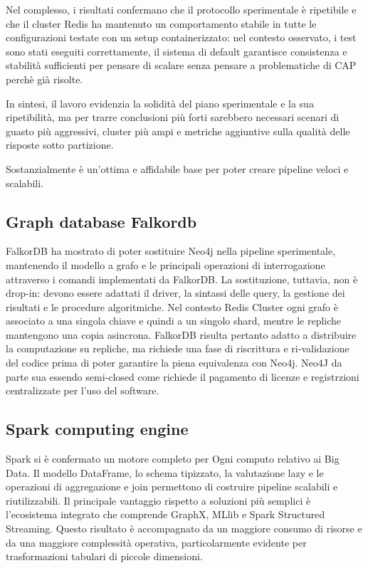 \documentclass{article}
\begin{document}
Nel complesso, i risultati confermano che il protocollo sperimentale è ripetibile e che il cluster Redis ha %
mantenuto un comportamento stabile in tutte le configurazioni testate con un %
setup containerizzato: %
nel contesto osservato, i test sono stati eseguiti correttamente, il sistema di default garantisce %
consistenza e stabilità sufficienti per pensare di scalare senza pensare a problematiche di CAP perchè
già risolte.

In sintesi, il lavoro evidenzia la solidità del piano sperimentale e la sua ripetibilità, ma per trarre %
conclusioni più forti sarebbero necessari scenari di guasto più aggressivi, cluster più ampi e metriche %
aggiuntive sulla qualità delle risposte sotto partizione.

Sostanzialmente è un'ottima e affidabile base per poter creare pipeline veloci e scalabili.

\subsection{Graph database Falkordb}
FalkorDB ha mostrato di poter sostituire Neo4j nella pipeline sperimentale, %
mantenendo il modello a grafo e le principali %
operazioni di interrogazione attraverso i comandi implementati da FalkorDB. La sostituzione, %
tuttavia, non è drop-in: devono essere adattati il driver, la sintassi delle query, %
la gestione dei risultati e le procedure algoritmiche. %
Nel contesto Redis Cluster ogni grafo è associato a una singola %
chiave e quindi a un singolo shard, mentre le repliche %
mantengono una copia asincrona. FalkorDB risulta pertanto adatto a distribuire la computazione %
su repliche, ma richiede una fase di riscrittura e %
ri-validazione del codice prima di poter garantire la piena equivalenza con Neo4j.
Neo4J da parte sua essendo semi-closed come richiede il pagamento di licenze e registrzioni %
centralizzate per l'uso del software.


\subsection{Spark computing engine}
Spark si è confermato un motore completo per Ogni computo relativo ai Big Data. Il modello %
DataFrame, lo schema tipizzato, la valutazione lazy e le operazioni %
di aggregazione e join permettono di costruire %
pipeline scalabili e riutilizzabili. Il principale vantaggio %
rispetto a soluzioni più semplici è l'ecosistema integrato %
che comprende GraphX, MLlib e Spark Structured Streaming. Questo %
risultato è accompagnato da un maggiore consumo di %
risorse e da una maggiore complessità operativa, particolarmente %
evidente per trasformazioni tabulari di piccole dimensioni.
\end{document}
